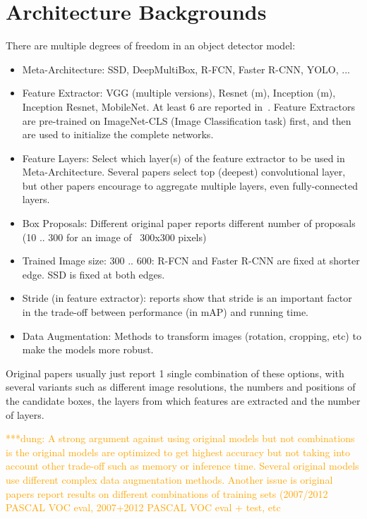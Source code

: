 \documentclass[conference]{IEEEtran}
\newcommand{\dungnote}[1]{ {\textcolor{orange} { ***dung: #1 }}}
\newcommand{\dungnote}[1]{}
\begin{document}
\section{Architecture Backgrounds}
There are multiple degrees of freedom in an object detector model:

\begin{itemize}
    \item Meta-Architecture: SSD, DeepMultiBox, R-FCN, Faster R-CNN, YOLO, ...
    \item Feature Extractor: VGG (multiple versions), Resnet (m), Inception (m), Inception Resnet, MobileNet. At least 6 are reported in~\cite{huang2017speed}. Feature Extractors are pre-trained on ImageNet-CLS (Image Classification task) first, and then are used to initialize the complete networks. 
    \item Feature Layers: Select which layer(s) of the feature extractor to be used in Meta-Architecture. Several papers select top (deepest) convolutional layer, but other papers encourage to aggregate multiple layers, even fully-connected layers.
    \item Box Proposals: Different original paper reports different number of proposals (10 .. 300 for an image of ~300x300 pixels)
    \item Trained Image size: 300 .. 600: R-FCN and Faster R-CNN are fixed at shorter edge. SSD is fixed at both edges.
    \item Stride (in feature extractor): reports show that stride is an important factor in the trade-off between performance (in mAP) and running time.
    \item Data Augmentation: Methods to transform images (rotation, cropping, etc) to make the models more robust.
\end{itemize}

Original papers usually just report 1 single combination of these options, with several variants such as different image resolutions, the numbers and positions of the candidate boxes, the layers from which features are extracted and the number of layers.

\dungnote{A strong argument against using original models but not combinations is the original models are optimized to get highest accuracy but not taking into account other trade-off such as memory or inference time. Several original models use different complex data augmentation methods. Another issue is original papers report results on different combinations of training sets (2007/2012 PASCAL VOC eval, 2007+2012 PASCAL VOC eval + test, etc}
\end{document}
